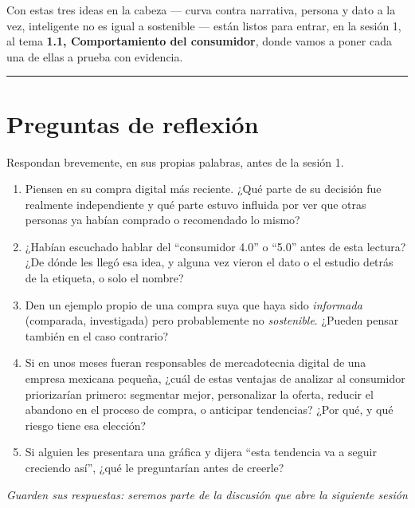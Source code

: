 \documentclass[12pt,letterpaper]{article}
\begin{document}
Con estas tres ideas en la cabeza --- curva contra narrativa, persona y dato
a la vez, inteligente no es igual a sostenible --- están listos para entrar,
en la sesión 1, al tema \textbf{1.1, Comportamiento del consumidor}, donde
vamos a poner cada una de ellas a prueba con evidencia.

\vspace{0.4cm}
\hrule
\vspace{0.4cm}

\section*{Preguntas de reflexión}

Respondan brevemente, en sus propias palabras, antes de la sesión 1.

\begin{enumerate}[leftmargin=1.4em, itemsep=6pt]
  \item Piensen en su compra digital más reciente. ¿Qué parte de su decisión
  fue realmente independiente y qué parte estuvo influida por ver que otras
  personas ya habían comprado o recomendado lo mismo?
  \item ¿Habían escuchado hablar del \enquote{consumidor 4.0} o \enquote{5.0} antes
  de esta lectura? ¿De dónde les llegó esa idea, y alguna vez vieron el dato
  o el estudio detrás de la etiqueta, o solo el nombre?
  \item Den un ejemplo propio de una compra suya que haya sido \emph{informada}
  (comparada, investigada) pero probablemente no \emph{sostenible}. ¿Pueden
  pensar también en el caso contrario?
  \item Si en unos meses fueran responsables de mercadotecnia digital de una
  empresa mexicana pequeña, ¿cuál de estas ventajas de analizar al
  consumidor priorizarían primero: segmentar mejor, personalizar la oferta,
  reducir el abandono en el proceso de compra, o anticipar tendencias? ¿Por
  qué, y qué riesgo tiene esa elección?
  \item Si alguien les presentara una gráfica y dijera \enquote{esta tendencia va
  a seguir creciendo así}, ¿qué le preguntarían antes de creerle?
\end{enumerate}

\vspace{0.3cm}
\begin{center}
\small\textit{Guarden sus respuestas: seremos parte de la discusión que abre la siguiente sesión}
\end{center}
\end{document}
